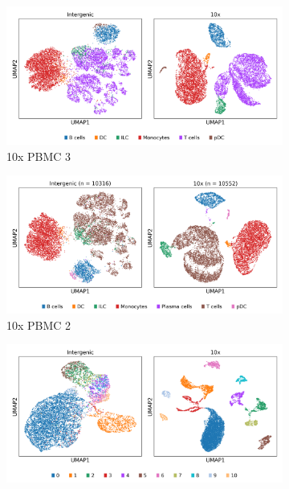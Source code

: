 \begin{figure}[htbp]
    \centering
    \begin{subfigure}{0.45\textwidth}
        \centering
        \includegraphics[width=\textwidth]{images/umaps/intergenic_10x_pbmc10x3.png}
        \caption{10x PBMC 3}
    \end{subfigure}
    \hfill
    \begin{subfigure}{0.45\textwidth}
        \centering
        \includegraphics[width=\textwidth]{images/umaps/intergenic_10x_pbmc10x2.png}
        \caption{10x PBMC 2}
    \end{subfigure}
    \vspace{0.5em}
    \begin{subfigure}{0.45\textwidth}
        \centering
        \includegraphics[width=\textwidth]{images/umaps/intergenic_10x_eye.png}

\end{subfigure}
\end{figure}
